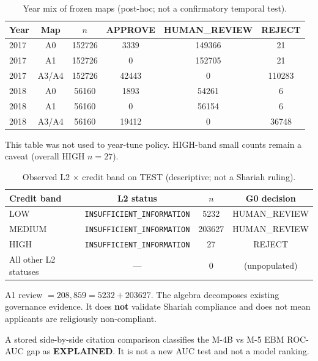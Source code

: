 \documentclass{ieeeaccess}
\begin{document}
\setcounter{table}{9}
\begin{table}[!t]
\caption{Year mix of frozen maps (post-hoc; not a confirmatory temporal test).}
\label{tab:t10}
\setlength{\tabcolsep}{2.4pt}
\centering
\scriptsize
\begin{tabular}{|l|c|c|c|c|c|}
\hline
Year & Map & \(n\) & APPROVE & HUMAN\_REVIEW & REJECT \\
\hline
2017 & A0 & 152726 & 3339 & 149366 & 21 \\
\hline
2017 & A1 & 152726 & 0 & 152705 & 21 \\
\hline
2017 & A3/A4 & 152726 & 42443 & 0 & 110283 \\
\hline
2018 & A0 & 56160 & 1893 & 54261 & 6 \\
\hline
2018 & A1 & 56160 & 0 & 56154 & 6 \\
\hline
2018 & A3/A4 & 56160 & 19412 & 0 & 36748 \\
\hline
\end{tabular}
\end{table}


This table was not used to year-tune policy. HIGH-band small counts remain a caveat (overall HIGH \(n=27\)).

\setcounter{table}{10}
\begin{table}[!t]
\caption{Observed L2 \(\times\) credit band on TEST (descriptive; not a Shariah ruling).}
\label{tab:t11}
\setlength{\tabcolsep}{2.4pt}
\centering
\footnotesize
\begin{tabular}{|l|c|c|c|}
\hline
Credit band & L2 status & \(n\) & G0 decision \\
\hline
LOW & \texttt{INSUFFICIENT\_INFORMATION} & 5232 & HUMAN\_REVIEW \\
\hline
MEDIUM & \texttt{INSUFFICIENT\_INFORMATION} & 203627 & HUMAN\_REVIEW \\
\hline
HIGH & \texttt{INSUFFICIENT\_INFORMATION} & 27 & REJECT \\
\hline
All other L2 statuses & --- & 0 & (unpopulated) \\
\hline
\end{tabular}
\end{table}


A1 review \(=208{,}859=5232+203627\). The algebra decomposes existing governance evidence. It does \textbf{not} validate Shariah compliance and does not mean applicants are religiously non-compliant.

A stored side-by-side citation comparison classifies the M-4B vs M-5 EBM ROC-AUC gap as \textbf{EXPLAINED}. It is not a new AUC test and not a model ranking.
\end{document}

